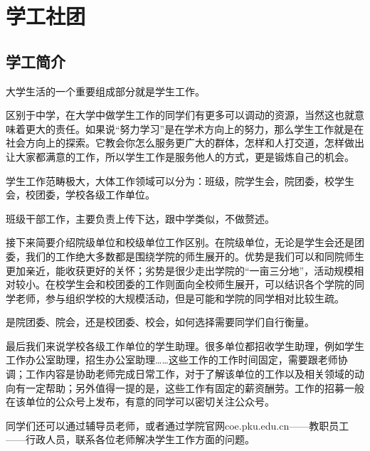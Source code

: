 \chapter{学工社团}
\section{学工简介}
大学生活的一个重要组成部分就是学生工作。

\vspace{10pt}

区别于中学，在大学中做学生工作的同学们有更多可以调动的资源，当然这也就意味着更大的责任。如果说“努力学习”是在学术方向上的努力，那么学生工作就是在社会方向上的探索。它教会你怎么服务更广大的群体，怎样和人打交道，怎样做出让大家都满意的工作，所以学生工作是服务他人的方式，更是锻炼自己的机会。

\vspace{10pt}

学生工作范畴极大，大体工作领域可以分为：班级，院学生会，院团委，校学生会，校团委，学校各级工作单位。

\vspace{10pt}

班级干部工作，主要负责上传下达，跟中学类似，不做赘述。

\vspace{10pt}

接下来简要介绍院级单位和校级单位工作区别。在院级单位，无论是学生会还是团委，我们的工作绝大多数都是围绕学院的师生展开的。优势是我们可以和同院师生更加亲近，能收获更好的关怀；劣势是很少走出学院的“一亩三分地”，活动规模相对较小。在校学生会和校团委的工作则面向全校师生展开，可以结识各个学院的同学老师，参与组织学校的大规模活动，但是可能和学院的同学相对比较生疏。

\vspace{10pt}

是院团委、院会，还是校团委、校会，如何选择需要同学们自行衡量。

\vspace{10pt}

最后我们来说学校各级工作单位的学生助理。很多单位都招收学生助理，例如学生工作办公室助理，招生办公室助理……这些工作的工作时间固定，需要跟老师协调；工作内容是协助老师完成日常工作，对于了解该单位的工作以及相关领域的动向有一定帮助；另外值得一提的是，这些工作有固定的薪资酬劳。工作的招募一般在该单位的公众号上发布，有意的同学可以密切关注公众号。

\vspace{10pt}

同学们还可以通过辅导员老师，或者通过学院官网coe.pku.edu.cn——教职员工——行政人员，联系各位老师解决学生工作方面的问题。

